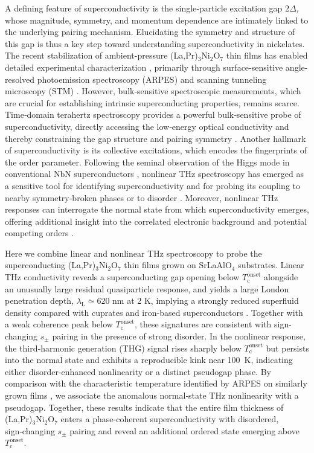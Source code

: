 \documentclass{nature}
\begin{document}
A defining feature of superconductivity is  the single‑particle excitation gap $2\Delta$, whose magnitude, symmetry, and momentum dependence are intimately linked to the underlying pairing mechanism. Elucidating the symmetry and structure of this gap is thus a key step toward understanding superconductivity in nickelates. The recent stabilization of ambient-pressure (La,Pr)$_3$Ni$_2$O$_7$ thin films has enabled detailed experimental characterization \cite{Ko2024,Zhou2025,Hao2025}, primarily through surface-sensitive angle-resolved photoemission spectroscopy (ARPES) and scanning tunneling microscopy (STM) \cite{shen2025LPSNO,10.1093/nsr/nwae429,wang2025,wangbai2025,fan2025}. However, bulk‑sensitive spectroscopic measurements, which are crucial for establishing intrinsic superconducting properties, remains scarce. Time‑domain terahertz spectroscopy provides a powerful bulk‑sensitive probe of superconductivity, directly accessing the low‑energy optical conductivity and thereby constraining the gap structure and pairing symmetry \cite{PhysRevB.50.6307,Bilbro2011,Cheng2024}. Another hallmark of superconductivity is its collective excitations, which encodes the fingerprints of the order parameter. Following the seminal observation of the Higgs mode in conventional NbN superconductors \cite{Matsunaga2013,Matsunaga2014}, nonlinear THz spectroscopy has emerged as a sensitive tool for identifying superconductivity and for probing its coupling to nearby symmetry‑broken phases \cite{Katsumi2018,Chu2020,Yuan2024,Kim2024} or to disorder \cite{wang2025anomal}. Moreover, nonlinear THz responses can interrogate the normal state from which superconductivity emerges, offering additional insight into the correlated electronic background and potential competing orders \cite{Katsumi2018,Chu2020,Feng2023,Yuan2024}. 


Here we combine linear and nonlinear THz spectroscopy to probe the superconducting (La,Pr)$_3$Ni$_2$O$_7$ thin films grown on SrLaAlO$_4$ substrates. Linear THz conductivity reveals a superconducting gap opening below $T_\mathrm{c}^{\mathrm{onset}}$ alongside an unusually large residual quasiparticle response, and yields a large London penetration depth, $\lambda_\mathrm{L}\simeq 620$ nm at 2 K, implying a strongly reduced superfluid density compared with cuprates and iron-based superconductors \cite{Boovi2016,Mller1990,Liprl2008,Williams2010}. Together with a weak coherence peak below $T_\mathrm{c}^{\mathrm{onset}}$, these signatures are consistent with sign-changing $s_{\pm}$ pairing in the presence of strong disorder. In the nonlinear response, the third‑harmonic generation (THG) signal rises sharply below $T_\mathrm{c}^{\mathrm{onset}}$ but persists into the normal state and exhibits a reproducible kink near 100 K, indicating either disorder‑enhanced nonlinearity or a distinct pseudogap phase. By comparison with the characteristic temperature identified by ARPES on similarly grown films \cite{shen2025LPSNO}, we associate the anomalous normal‑state THz nonlinearity with a pseudogap. Together, these results indicate that the entire film thickness of (La,Pr)$_3$Ni$_2$O$_7$ enters a phase-coherent superconductivity with disordered, sign‑changing $s_{\pm}$ pairing and reveal an additional ordered state emerging above $T_\mathrm{c}^{\mathrm{onset}}$.
\end{document}

